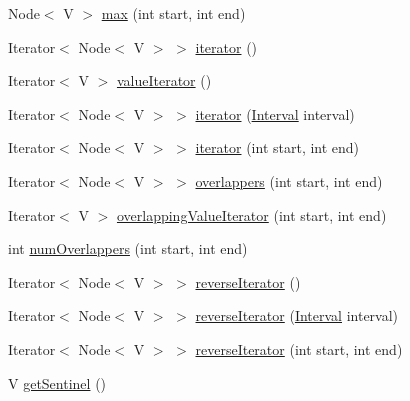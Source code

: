 \begin{DoxyCompactItemize}
Node$<$ V $>$ \hyperlink{classbroad_1_1core_1_1datastructures_1_1_interval_tree_3_01_v_01_4_a5e7608a6cbeed9b3f91b83f4cb9ee429}{max} (int start, int end)
\item 
Iterator$<$ Node$<$ V $>$ $>$ \hyperlink{classbroad_1_1core_1_1datastructures_1_1_interval_tree_3_01_v_01_4_a73216589487fa7fc30889620f6baaabe}{iterator} ()
\item 
Iterator$<$ V $>$ \hyperlink{classbroad_1_1core_1_1datastructures_1_1_interval_tree_3_01_v_01_4_a27c5ec641b17a30c712164f96cb8a0b6}{value\+Iterator} ()
\item 
Iterator$<$ Node$<$ V $>$ $>$ \hyperlink{classbroad_1_1core_1_1datastructures_1_1_interval_tree_3_01_v_01_4_a9727995889413a674272f79899f4a932}{iterator} (\hyperlink{interfacebroad_1_1core_1_1datastructures_1_1_interval}{Interval} interval)
\item 
Iterator$<$ Node$<$ V $>$ $>$ \hyperlink{classbroad_1_1core_1_1datastructures_1_1_interval_tree_3_01_v_01_4_a959b745dcdf8f56ac335bcb7acff2abf}{iterator} (int start, int end)
\item 
Iterator$<$ Node$<$ V $>$ $>$ \hyperlink{classbroad_1_1core_1_1datastructures_1_1_interval_tree_3_01_v_01_4_a825bb5dfdba1b55ae38acee386ef9f4f}{overlappers} (int start, int end)
\item 
Iterator$<$ V $>$ \hyperlink{classbroad_1_1core_1_1datastructures_1_1_interval_tree_3_01_v_01_4_abb326cb9a9275b3d0276bf9f2cfa6bd3}{overlapping\+Value\+Iterator} (int start, int end)
\item 
int \hyperlink{classbroad_1_1core_1_1datastructures_1_1_interval_tree_3_01_v_01_4_ac6d0c8a9c71d29dcd7cfc67006c7e6c9}{num\+Overlappers} (int start, int end)
\item 
Iterator$<$ Node$<$ V $>$ $>$ \hyperlink{classbroad_1_1core_1_1datastructures_1_1_interval_tree_3_01_v_01_4_a19ffe47e0ae286afffa71ed50812d34f}{reverse\+Iterator} ()
\item 
Iterator$<$ Node$<$ V $>$ $>$ \hyperlink{classbroad_1_1core_1_1datastructures_1_1_interval_tree_3_01_v_01_4_a696aaef2df281d57bc671519cb4663b0}{reverse\+Iterator} (\hyperlink{interfacebroad_1_1core_1_1datastructures_1_1_interval}{Interval} interval)
\item 
Iterator$<$ Node$<$ V $>$ $>$ \hyperlink{classbroad_1_1core_1_1datastructures_1_1_interval_tree_3_01_v_01_4_a38cc736f2fcbb6425dc56299784770b4}{reverse\+Iterator} (int start, int end)
\item 
V \hyperlink{classbroad_1_1core_1_1datastructures_1_1_interval_tree_3_01_v_01_4_a3542cde71dcd6d21b8b693ebacd38172}{get\+Sentinel} ()

\end{DoxyCompactItemize}
